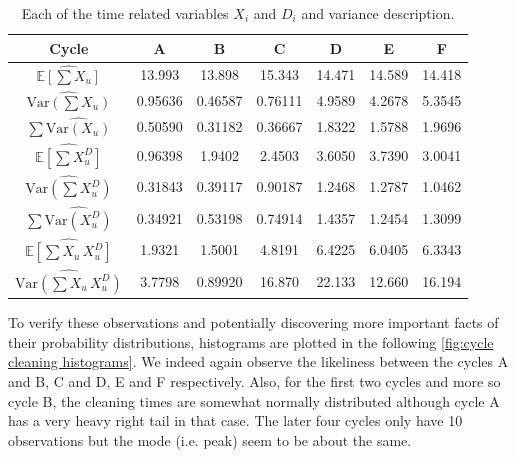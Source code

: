 \documentclass[../Thesis.tex]{subfiles}
\begin{document}
\begin{table}[h]
    \centering
    \begin{tabular}{c|cccccc}
        Cycle                                                 & A       & B       & C       & D      & E      & F      \\\hline
        $\widehat{\mathbb{E}\left[\sum X_u\right]}$           & 13.993  & 13.898  & 15.343  & 14.471 & 14.589 & 14.418 \\\hline
        $\widehat{\text{Var}\left(\sum X_u\right)}$           & 0.95636 & 0.46587 & 0.76111 & 4.9589 & 4.2678 & 5.3545 \\\hline
        $\sum \widehat{\text{Var}\left(X_u\right)}$           & 0.50590 & 0.31182 & 0.36667 & 1.8322 & 1.5788 & 1.9696 \\\hline
        $\widehat{\mathbb{E} \left[\sum X^D_u\right]}$        & 0.96398 & 1.9402  & 2.4503  & 3.6050 & 3.7390 & 3.0041 \\\hline
        $\widehat{ \text{Var} \left(\sum X^D_u\right)}$       & 0.31843 & 0.39117 & 0.90187 & 1.2468 & 1.2787 & 1.0462 \\\hline
        $\sum \widehat{\text{Var}\left(X^D_u\right)}$         & 0.34921 & 0.53198 & 0.74914 & 1.4357 & 1.2454 & 1.3099 \\\hline
        $\widehat{\mathbb{E} \left[\sum X_u \, X^D_u\right]}$ & 1.9321  & 1.5001  & 4.8191  & 6.4225 & 6.0405 & 6.3343 \\\hline
        $\widehat{\text{Var} \left(\sum X_u \, X^D_u\right)}$ & 3.7798  & 0.89920 & 16.870  & 22.133 & 12.660 & 16.194
    \end{tabular}
    \caption{Each of the time related variables $X_i$ and $D_i$ and variance description.}
    \label{tab:data variation and covariance}
\end{table}

To verify these observations and potentially discovering more important facts of their probability distributions, histograms are plotted in the following \autoref{fig:cycle cleaning histograms}. We indeed again observe the likeliness between the cycles A and B, C and D, E and F respectively. Also, for the first two cycles and more so cycle B, the cleaning times are somewhat normally distributed although cycle A has a very heavy right tail in that case. The later four cycles only have 10 observations but the mode (i.e. peak) seem to be about the same.
\end{document}
